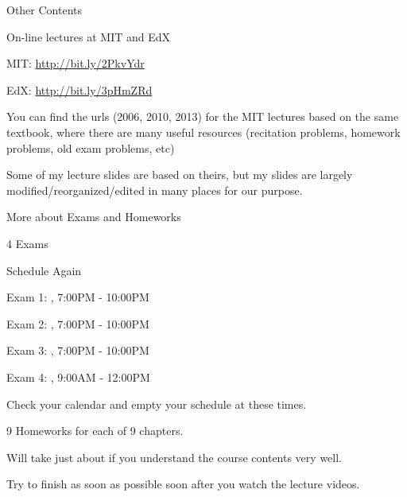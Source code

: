 \begin{frame}{Other Contents}

\bci 

\item On-line lectures at MIT and EdX
\bci
\item MIT: \url{http://bit.ly/2PkvYdr}
\item EdX: \url{http://bit.ly/3pHmZRd}

\item You can find the urls (2006, 2010, 2013) for the MIT lectures
  based on the same textbook, where there are many useful resources
  (recitation problems, homework problems, old exam problems, etc)

\medskip
\item Some of my lecture slides are based on theirs, but my slides
   are largely  modified/reorganized/edited in many places for our
   purpose. 
\eci

\eci

\end{frame}





\begin{frame}{More about Exams and Homeworks}

\bci 

\item 4 Exams

\item Schedule Again

\bci
\item Exam 1: , 7:00PM - 10:00PM
\item Exam 2: , 7:00PM - 10:00PM
\item Exam 3: , 7:00PM - 10:00PM
\item Exam 4: , 9:00AM - 12:00PM
\item Check your calendar and empty your schedule at these times. 
  \eci

\item 9 Homeworks for each of 9 chapters. 
  \bci
  \item Will take just about  if you understand the course
    contents very well.

    \item Try to finish as soon as possible soon after you watch the lecture videos. 
  \eci

  \eci

\end{frame}

